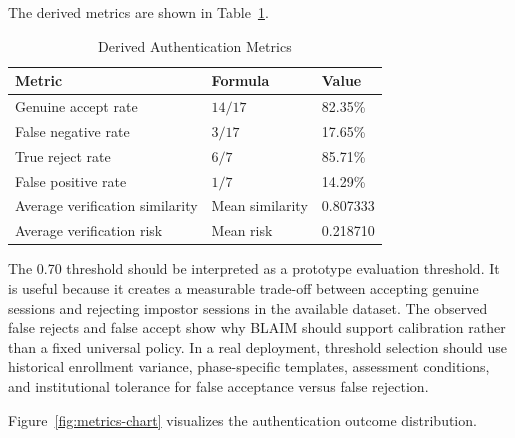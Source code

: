 The derived metrics are shown in Table~\ref{tab:auth-metrics}.

\begin{table}[H]
  \centering
  \caption{Derived Authentication Metrics}
  \label{tab:auth-metrics}
  \begin{singlespace}
  \begin{tabularx}{\textwidth}{@{}p{7.0cm}p{3.4cm}p{3.2cm}@{}}
    \toprule
    \textbf{Metric} & \textbf{Formula} & \textbf{Value} \\
    \midrule
    Genuine accept rate & $14 / 17$ & 82.35\% \\
    False negative rate & $3 / 17$ & 17.65\% \\
    True reject rate & $6 / 7$ & 85.71\% \\
    False positive rate & $1 / 7$ & 14.29\% \\
    Average verification similarity & Mean similarity & 0.807333 \\
    Average verification risk & Mean risk & 0.218710 \\
    \bottomrule
  \end{tabularx}
  \end{singlespace}
\end{table}

The 0.70 threshold should be interpreted as a prototype evaluation threshold. It is useful because it creates a measurable trade-off between accepting genuine sessions and rejecting impostor sessions in the available dataset. The observed false rejects and false accept show why BLAIM should support calibration rather than a fixed universal policy. In a real deployment, threshold selection should use historical enrollment variance, phase-specific templates, assessment conditions, and institutional tolerance for false acceptance versus false rejection.

Figure~\ref{fig:metrics-chart} visualizes the authentication outcome distribution.


